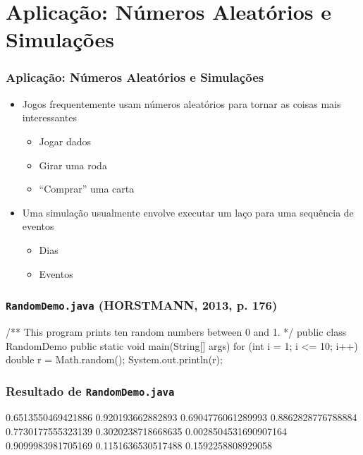 \documentclass[xcolor={dvipsnames,table},aspectratio=169]{beamer}
\begin{document}
\section{Aplicação: Números Aleatórios e Simulações}

\begin{frame}\frametitle{Aplicação: Números Aleatórios e Simulações}
\begin{itemize}
	\item Jogos frequentemente usam números aleatórios para tornar as coisas mais interessantes
	\begin{itemize}
		\item Jogar dados
		\item Girar uma roda
		\item ``Comprar'' uma carta
	\end{itemize}
	\item Uma simulação usualmente envolve executar um laço para uma sequência de eventos
	\begin{itemize}
		\item Dias
		\item Eventos
	\end{itemize}
\end{itemize}
\end{frame}

\begin{frame}[fragile]\frametitle{\texttt{RandomDemo.java} {\tiny (HORSTMANN, 2013, p. 176)}}
\begin{javacode}
/**
   This program prints ten random numbers between 0 and 1.
*/
public class RandomDemo {
   public static void main(String[] args) {
      for (int i = 1; i <= 10; i++) {
         double r = Math.random();
         System.out.println(r);
      }
   }
}
\end{javacode}
\end{frame}

\begin{frame}[fragile]\frametitle{Resultado de \texttt{RandomDemo.java}}
\begin{javacode}
0.6513550469421886
0.920193662882893
0.6904776061289993
0.8862828776788884
0.7730177555323139
0.3020238718668635
0.0028504531690907164
0.9099983981705169
0.1151636530517488
0.1592258808929058
\end{javacode}
\end{frame}
\end{document}
